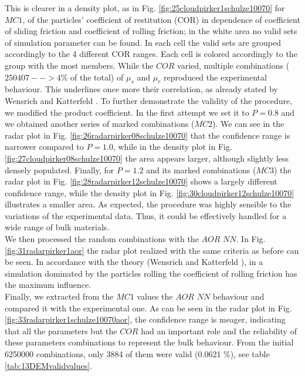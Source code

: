 This is clearer in a density plot, as in Fig. 
\ref{fig:25cloudpirker1schulze10070} for $MC1$, 
of the particles' coefficient of restitution (COR) in dependence
of coefficient of sliding friction and coefficient of rolling friction; in the
white area no valid sets of simulation parameter can be found.
In each cell the valid sets are grouped accordingly to the 4 different COR
ranges.
Each cell is colored accordingly to the group with the most members. 
While the $COR$ varied, multiple
combinations ($250407 --> 4\% $ of the total) of $\mu_s$ and $\mu_r$ reproduced
the experimental behaviour.
This underlines once more their correlation, as already stated by Wensrich and 
Katterfeld \cite{RefWorks:87}.
To further demonstrate the validity of the procedure, we modified the product
coefficient. In the first attempt we set it to $P=0.8$ and we obtained another
series of marked combinations ($MC2$).
We can see in the radar plot in Fig.
\ref{fig:26radarpirker08schulze10070} that the confidence range is narrower
compared to $P=1.0$, while in the density plot in Fig. 
\ref{fig:27cloudpirker08schulze10070} the area
appears larger, although slightly less densely populated. Finally, for $P=1.2$
and its marked combinations ($MC3$) the radar plot in Fig.
\ref{fig:28radarpirker12schulze10070} shows a largely different confidence
range, while the density plot in Fig. \ref{fig:30cloudpirker12schulze10070} 
illustrates a smaller area. As expected, the procedure was highly sensible to the variations of the experimental data. 
Thus, it could be effectively handled for a wide range of bulk materials.\\
We then processed the random combinations with the $AOR$ $NN$. In Fig.
\ref{fig:31radarpirker1aor} the radar plot realized with the same criteria as
before can be seen.
In accordance with the theory (Wensrich and Katterfeld \cite{RefWorks:87}), in a simulation dominated
by the particles rolling the coefficient of rolling friction has the maximum
influence. \\
Finally, we extracted from the $MC1$ values the $AOR$ $NN$ behaviour
and compared it with the experimental one.
As can be seen in the radar plot in Fig.
\ref{fig:33radarpirker1schulze10070aor}, the confidence range is meager, indicating that all the parameters but the $COR$ 
had an important role and the reliability of these parameters combinations to represent the bulk behaviour. 
From the initial 6250000 combinations, only 3884 of them were valid (0.0621 \%),
see table \ref{tab:13DEMvalidvalues}.





